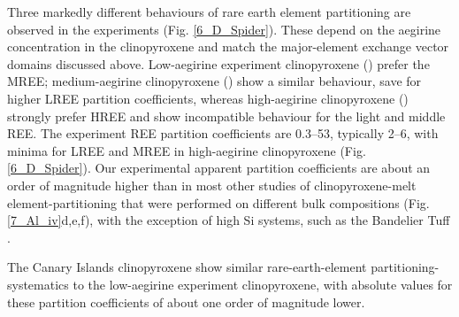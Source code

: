 \documentclass[review,authoryear,12pt]{elsarticle}
\begin{document}
 Three markedly different behaviours of rare earth element partitioning are observed in the experiments (Fig. \ref{6_D_Spider}). These depend on the aegirine concentration in the clinopyroxene and match the major-element exchange vector domains discussed above. Low-aegirine experiment clinopyroxene () prefer the MREE; medium-aegirine clinopyroxene () show a similar behaviour, save for higher LREE partition coefficients, whereas high-aegirine clinopyroxene () strongly prefer HREE and show incompatible behaviour for the light and middle REE. The experiment REE partition coefficients are 0.3--53, typically 2--6, with minima for LREE and MREE in high-aegirine clinopyroxene (Fig. \ref{6_D_Spider}). Our experimental apparent partition coefficients are about an order of magnitude higher than in most other studies of clinopyroxene-melt element-partitioning that were performed on different bulk compositions (Fig. \ref{7_Al_iv}d,e,f), with the exception of high Si systems, such as the Bandelier Tuff \citep[cf.][]{Olin2010}.

  The Canary Islands clinopyroxene show similar rare-earth-element partitioning-systematics to the low-aegirine experiment clinopyroxene, with absolute values for these partition coefficients of about one order of magnitude lower.
\end{document}
